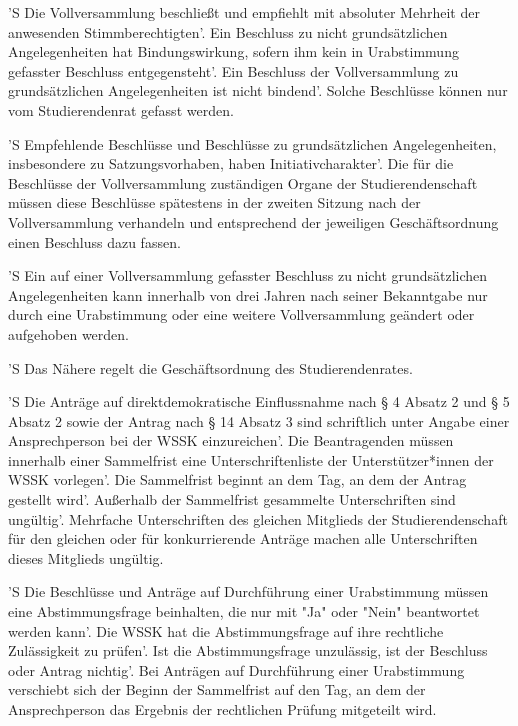 \documentclass[fontsize=12pt,parskip=half]{scrartcl}
\begin{document}
\begin{contract}
  'S Die Vollversammlung beschließt und empfiehlt mit absoluter Mehrheit der
  anwesenden Stimmberechtigten'. Ein Beschluss zu nicht grundsätzlichen
  Angelegenheiten hat Bindungswirkung, sofern ihm kein in Urabstimmung gefasster
  Beschluss entgegensteht'. Ein Beschluss der Vollversammlung zu grundsätzlichen
  Angelegenheiten ist nicht bindend'. Solche Beschlüsse können nur vom
  Studierendenrat gefasst werden.

  'S Empfehlende Beschlüsse und Beschlüsse zu grundsätzlichen Angelegenheiten,
  insbesondere zu Satzungsvorhaben, haben Initiativcharakter'. Die für die
  Beschlüsse der Vollversammlung zuständigen Organe der Studierendenschaft
  müssen diese Beschlüsse spätestens in der zweiten Sitzung nach der
  Vollversammlung verhandeln und entsprechend der jeweiligen Geschäftsordnung
  einen Beschluss dazu fassen.

  'S Ein auf einer Vollversammlung gefasster Beschluss zu nicht grundsätzlichen
  Angelegenheiten kann innerhalb von drei Jahren nach seiner Bekanntgabe nur
  durch eine Urabstimmung oder eine weitere Vollversammlung geändert oder
  aufgehoben werden.

  'S Das Nähere regelt die Geschäftsordnung des Studierendenrates.



  'S Die Anträge auf direktdemokratische Einflussnahme nach § 4 Absatz 2 und § 5
  Absatz 2 sowie der Antrag nach § 14 Absatz 3 sind schriftlich unter Angabe
  einer Ansprechperson bei der WSSK einzureichen'. Die Beantragenden müssen
  innerhalb einer Sammelfrist eine Unterschriftenliste der Unterstützer*innen
  der WSSK vorlegen'. Die Sammelfrist beginnt an dem Tag, an dem der Antrag
  gestellt wird'. Außerhalb der Sammelfrist gesammelte Unterschriften sind
  ungültig'. Mehrfache Unterschriften des gleichen Mitglieds der
  Studierendenschaft für den gleichen oder für konkurrierende Anträge machen
  alle Unterschriften dieses Mitglieds ungültig.

  'S Die Beschlüsse und Anträge auf Durchführung einer Urabstimmung müssen eine
  Abstimmungsfrage beinhalten, die nur mit "Ja" oder "Nein" beantwortet werden
  kann'. Die WSSK hat die Abstimmungsfrage auf ihre rechtliche Zulässigkeit zu
  prüfen'. Ist die Abstimmungsfrage unzulässig, ist der Beschluss oder Antrag
  nichtig'. Bei Anträgen auf Durchführung einer Urabstimmung verschiebt sich der
  Beginn der Sammelfrist auf den Tag, an dem der Ansprechperson das Ergebnis der
  rechtlichen Prüfung mitgeteilt wird.


\end{contract}
\end{document}
